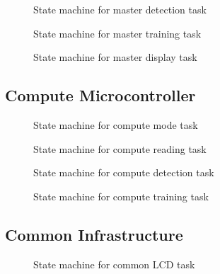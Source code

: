 \documentclass{article}
\begin{document}
\begin{figure}[H]
  \centering
  \caption{State machine for master detection task}
  
  \label{sm:2}
\end{figure}

\begin{figure}[H]
  \centering
  \caption{State machine for master training task}
  
  \label{sm:3}
\end{figure}

\begin{figure}[H]
  \centering
  \caption{State machine for master display task}
  
  \label{sm:4}
\end{figure}

\subsection{Compute Microcontroller}
\label{app.sm.compute}

\begin{figure}[H]
  \centering
  \caption{State machine for compute mode task}
  
  \label{sm:5}
\end{figure}

\begin{figure}[H]
  \centering
  \caption{State machine for compute reading task}
  
  \label{sm:6}
\end{figure}

\begin{figure}[H]
  \centering
  \caption{State machine for compute detection task}
  
  \label{sm:7}
\end{figure}

\begin{figure}[H]
  \centering
  \caption{State machine for compute training task}
  
  \label{sm:8}
\end{figure}

\subsection{Common Infrastructure}
\label{app.sm.common}

\begin{figure}[H]
  \centering
  \caption{State machine for common LCD task}
  
  \label{sm:9}
\end{figure}
\end{document}
